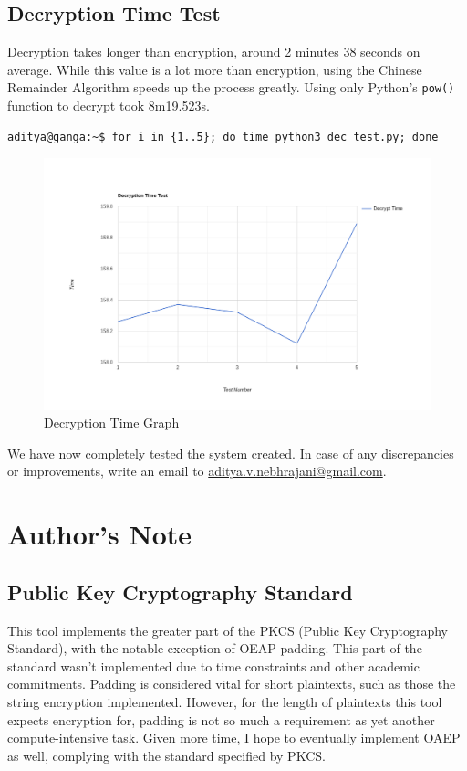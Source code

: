 \documentclass[twoside]{article}
\begin{document}
\subsection{Decryption Time Test}
Decryption takes longer than encryption, around 2 minutes 38 seconds on average. While this value is
a lot more than encryption, using the Chinese Remainder Algorithm speeds up the process greatly.
Using only Python's \texttt{pow()} function to decrypt took 8m19.523s.

\begin{verbatim}
aditya@ganga:~$ for i in {1..5}; do time python3 dec_test.py; done
\end{verbatim}


\begin{figure}[H]
  \centering
  \includegraphics[scale=0.25]{dg.png}
  \caption{Decryption Time Graph}
\end{figure}
We have now completely tested the system created. In case of any discrepancies or improvements,
write an email to \href{mailto: aditya.v.nebhrajani@gmail.com}{aditya.v.nebhrajani@gmail.com}.



\cleardoublepage

\section{Author's Note}
\subsection{Public Key Cryptography Standard}
This tool implements the greater part of the PKCS (Public Key Cryptography Standard), with the
notable exception of OEAP padding. This part of the standard wasn't implemented due to time
constraints and other academic commitments. Padding is considered vital for short plaintexts, such
as those the string encryption implemented. However, for the length of plaintexts this tool
expects encryption for, padding is not so much a requirement as yet another compute-intensive task.
Given more time, I hope to eventually implement OAEP as well, complying with the standard
specified by PKCS.
\end{document}
